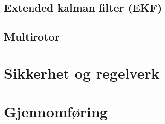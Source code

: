 \documentclass[
10pt, %
a4paper, %
oneside, %
headinclude,footinclude, %
BCOR5mm, %
]{scrartcl}
\begin{document}
\begin{sloppypar}
\subsection{Extended kalman filter (EKF)}


\subsection{Multirotor}



\newpage
\section{Sikkerhet og regelverk}


\section{Gjennomføring}



\newpage
\renewcommand{\refname}{\spacedlowsmallcaps{References}} %

%


\printbibliography

\end{sloppypar}
\end{document}
